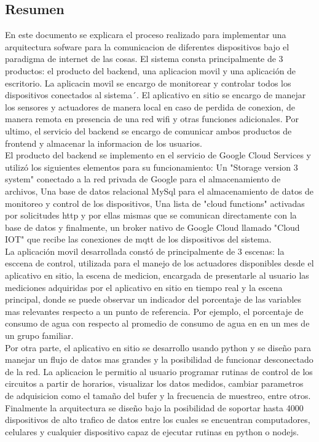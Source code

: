 \subsection{Resumen}
En este documento se explicara el proceso realizado para implementar una arquitectura sofware para la comunicacion de diferentes dispositivos bajo el paradigma de internet de las cosas. El sistema consta principalmente de 3 productos: el producto del backend, una aplicacion movil y una aplicación de escritorio. La aplicacin movil se encargo de monitorear y controlar todos los dispositivos conectados al sistema´. El aplicativo en sitio se encargo de manejar los sensores y actuadores de manera local en caso de perdida de conexion, de manera remota en presencia de una red wifi y otras funciones adicionales. Por ultimo, el servicio del backend se encargo de comunicar ambos productos de frontend y almacenar la informacion de los usuarios.
\vspace{0.5cm}\\
El producto del backend se implemento en el servicio de Google Cloud Services y utilizó los siguientes elementos para su funcionamiento: Un "Storage version 3 system" conectado a la red privada de Google para el almacenamiento de archivos, Una base de datos relacional MySql para el almacenamiento de datos de monitoreo y control de los dispositivos, Una lista de "cloud functions" activadas por solicitudes http y por ellas mismas que se comunican directamente con la base de datos y finalmente, un broker nativo de Google Cloud llamado "Cloud IOT" que recibe las conexiones de mqtt de los dispositivos del sistema.
\vspace{0.5cm}\\
La aplicación movil desarrollada constó de principalmente de 3 escenas: la esccena de control, utilizada para el manejo de los actuadores disponibles desde el aplicativo en sitio, la escena de medicion, encargada de presentarle al usuario las mediciones adquiridas por el aplicativo en sitio en tiempo real y la escena principal, donde se puede observar un indicador del porcentaje de las variables mas relevantes respecto a un punto de referencia. Por ejemplo, el porcentaje de consumo de agua con respecto al promedio de consumo de agua en en un mes de un grupo familiar.
\vspace{0.5cm}\\
Por otra parte, el aplicativo en sitio se desarrollo usando python y se diseño para manejar un flujo de datos mas grandes y la posibilidad de funcionar desconectado de la red. La aplicacion le permitio al usuario programar rutinas de control de los circuitos a partir de horarios, visualizar los datos medidos, cambiar parametros de adquisicion como el tamaño del bufer y la frecuencia de muestreo, entre otros.
\vspace{0.5cm}\\
Finalmente la arquitectura se diseño bajo la posibilidad de soportar hasta 4000 dispositivos de alto trafico de datos entre los cuales se encuentran computadores, celulares y cualquier dispositivo capaz de ejecutar rutinas en python o nodejs. 
